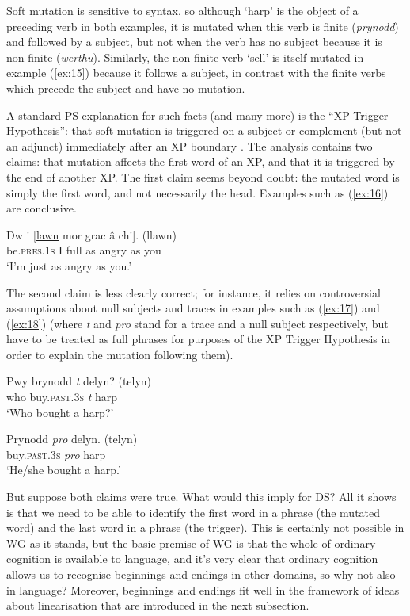 \documentclass[output=paper
	        ,collection
	        ,collectionchapter
 	        ,biblatex
                ,babelshorthands
                ,newtxmath
                ,draftmode
                ,colorlinks, citecolor=brown
]{langscibook}
\begin{document}
Soft mutation is sensitive to syntax, so although ‘harp’ is the object of a preceding verb in both examples, it is mutated when this verb is finite (\emph{prynodd}) and followed by a subject, but not when the verb has no subject because it is non-finite (\emph{werthu}). Similarly, the non-finite verb ‘sell’ is itself mutated in example (\ref{ex:15}) because it follows a subject, in contrast with the finite verbs which precede the subject and have no mutation.

A standard PS explanation for such facts (and many more) is the ``XP Trigger Hypothesis'': that soft mutation is triggered on a subject or complement (but not an adjunct) immediately after an XP boundary \citep[226]{BorsleyTallermanWillis2007}. The analysis contains two claims: that mutation affects the first word of an XP, and that it is triggered by the end of another XP. The first claim seems beyond doubt: the mutated word is simply the first word, and not necessarily the head. Examples such as (\ref{ex:16}) are conclusive.

\begin{exe}
	\ex \label{ex:16}
	\gll Dw i [\underline{lawn} mor grac â chi]. (llawn)\\
	be.\textsc{pres}.1\textsc{s} I full as angry as you\\
	\glt ‘I’m just as angry as you.’
\end{exe}

The second claim is less clearly correct; for instance, it relies on controversial assumptions about null subjects and traces in examples such as (\ref{ex:17}) and (\ref{ex:18}) (where \emph{t} and \emph{pro} stand for a trace and a null subject respectively, but have to be treated as full phrases for purposes of the XP Trigger Hypothesis in order to explain the mutation following them).

\begin{exe}
	\ex \label{ex:17}
	\gll Pwy brynodd \emph{t} delyn? (telyn)\\
	who buy.\textsc{past}.3\textsc{s} \emph{t} harp\\
	\glt ‘Who bought a harp?’

	\ex \label{ex:18}
	\gll Prynodd \emph{pro} delyn. (telyn)\\
	buy.\textsc{past}.3\textsc{s} \emph{pro} harp\\
	\glt ‘He/she bought a harp.’
\end{exe}

But suppose both claims were true. What would this imply for DS? All it shows is that we need to be able to identify the first word in a phrase (the mutated word) and the last word in a phrase (the trigger). This is certainly not possible in WG as it stands, but the basic premise of WG is that the whole of ordinary cognition is available to language, and it’s very clear that ordinary cognition allows us to recognise beginnings and endings in other domains, so why not also in language? Moreover, beginnings and endings fit well in the framework of ideas about linearisation that are introduced in the next subsection.
\end{document}
